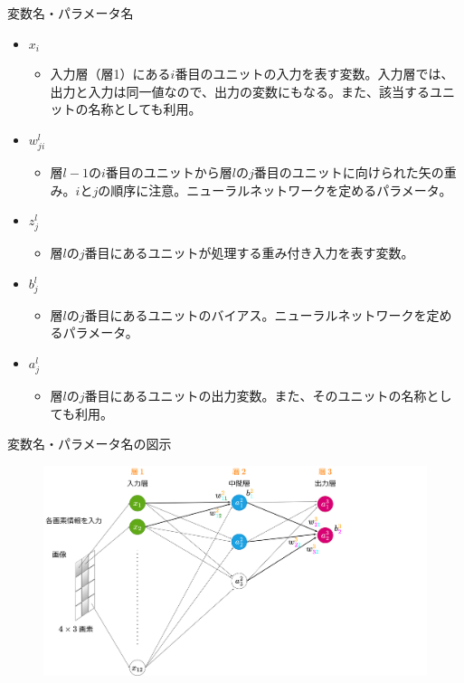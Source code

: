 \documentclass[dvipdfmx,aspectratio=169]{beamer}
\begin{document}
	\begin{frame}{変数名・パラメータ名}
		\begin{itemize}
			\item $ x_i $
				\begin{itemize}
					\item 入力層（層1）にある$ i $番目のユニットの入力を表す変数。入力層では、出力と入力は同一値なので、出力の変数にもなる。また、該当するユニットの名称としても利用。
				\end{itemize}
			\item $ w^l_{ji} $
				\begin{itemize}
					\item 層$ l-1 $の$ i $番目のユニットから層$ l $の$ j $番目のユニットに向けられた矢の重み。$ i $と$ j $の順序に注意。ニューラルネットワークを定めるパラメータ。
				\end{itemize}
			\item $ z^l_j $
				\begin{itemize}
					\item 層$ l $の$ j $番目にあるユニットが処理する重み付き入力を表す変数。
				\end{itemize}
			\item $ b^l_j $
				\begin{itemize}
					\item 層$ l $の$ j $番目にあるユニットのバイアス。ニューラルネットワークを定めるパラメータ。
				\end{itemize}
			\item $ a^l_j $
				\begin{itemize}
					\item 層$ l $の$ j $番目にあるユニットの出力変数。また、そのユニットの名称としても利用。
				\end{itemize}
		\end{itemize}
	\end{frame}
	\begin{frame}{変数名・パラメータ名の図示}
		\begin{figure}
			\centering
			\includegraphics[width=0.9\linewidth]{img/illustration-of-variable-and-parameter-names}
		\end{figure}
	\end{frame}
\end{document}
